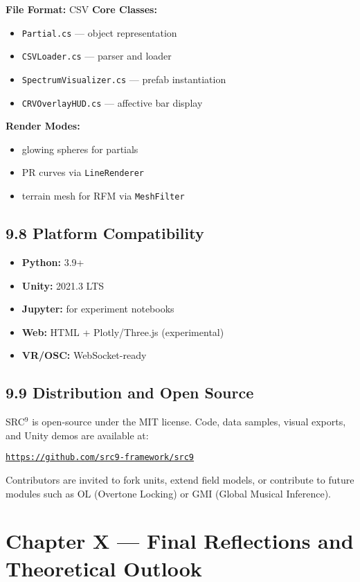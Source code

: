 \textbf{File Format:} CSV  
\textbf{Core Classes:}
\begin{itemize}
    \item \texttt{Partial.cs} — object representation
    \item \texttt{CSVLoader.cs} — parser and loader
    \item \texttt{SpectrumVisualizer.cs} — prefab instantiation
    \item \texttt{CRVOverlayHUD.cs} — affective bar display
\end{itemize}

\textbf{Render Modes:}
\begin{itemize}
    \item glowing spheres for partials
    \item PR curves via \texttt{LineRenderer}
    \item terrain mesh for RFM via \texttt{MeshFilter}
\end{itemize}

\subsection*{9.8 Platform Compatibility}

\begin{itemize}
    \item \textbf{Python:} 3.9+
    \item \textbf{Unity:} 2021.3 LTS
    \item \textbf{Jupyter:} for experiment notebooks
    \item \textbf{Web:} HTML + Plotly/Three.js (experimental)
    \item \textbf{VR/OSC:} WebSocket-ready
\end{itemize}

\subsection*{9.9 Distribution and Open Source}

SRC$^{9}$ is open-source under the MIT license. Code, data samples, visual exports, and Unity demos are available at:

\texttt{\url{https://github.com/src9-framework/src9}}

Contributors are invited to fork units, extend field models, or contribute to future modules such as OL (Overtone Locking) or GMI (Global Musical Inference).

\section*{Chapter X — Final Reflections and Theoretical Outlook}

